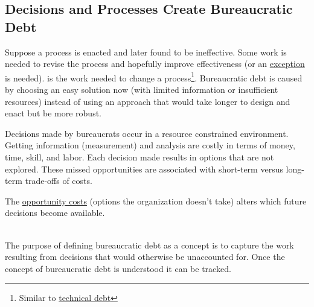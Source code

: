 \subsection*{Decisions and Processes Create Bureaucratic Debt\label{sec:bureaucratic-debt}}


Suppose a \gls{process} is enacted and later found to be ineffective. Some work is needed to revise the process and hopefully improve effectiveness (or an \hyperref[sec:exceptions-to-process]{exception} is needed).
\iftoggle{glossarysubstitutionworks}{\Gls{bureaucratic debt}}{Bureaucratic debt}
is 
 the work needed to change a process\footnote{Similar to \href{https://en.wikipedia.org/wiki/Technical_debt}{technical debt}
}. 
Bureaucratic debt is caused by choosing an easy solution now (with limited information or insufficient resources) instead of using an approach that would take longer to design and enact but be more robust.


Decisions made by \glspl{bureaucrat} occur in a resource constrained environment.
Getting information (measurement) and analysis are costly in terms of money, time, skill, and labor.
Each decision made results in options that are not explored. These missed opportunities are associated with short-term versus long-term trade-offs of costs.

The \href{https://en.wikipedia.org/wiki/Opportunity_cost}{opportunity costs}
(options the organization doesn't take) alters which future decisions become available.

\ \\

The purpose of defining bureaucratic debt as a concept is to capture the work resulting from decisions that would otherwise be unaccounted for.
Once the concept of bureaucratic debt is understood it can be tracked.

